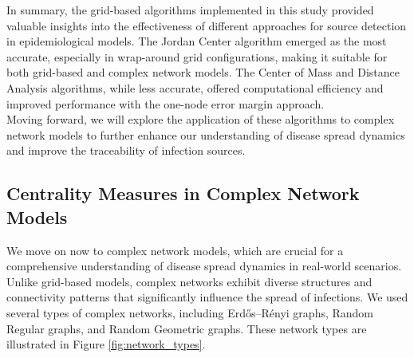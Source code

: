 In summary, the grid-based algorithms implemented in this study provided valuable insights into the effectiveness of different approaches for source detection in epidemiological models. The Jordan Center algorithm emerged as the most accurate, especially in wrap-around grid configurations, making it suitable for both grid-based and complex network models. The Center of Mass and Distance Analysis algorithms, while less accurate, offered computational efficiency and improved performance with the one-node error margin approach.\\

Moving forward, we will explore the application of these algorithms to complex network models to further enhance our understanding of disease spread dynamics and improve the traceability of infection sources.

\subsection{Centrality Measures in Complex Network Models}

We move on now to complex network models, which are crucial for a comprehensive understanding of disease spread dynamics in real-world scenarios. Unlike grid-based models, complex networks exhibit diverse structures and connectivity patterns that significantly influence the spread of infections. We used several types of complex networks, including Erdős–Rényi graphs, Random Regular graphs, and Random Geometric graphs. These network types are illustrated in Figure \ref{fig:network_types}.

